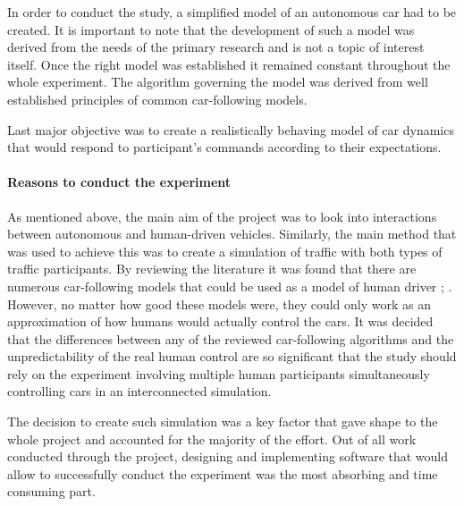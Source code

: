 \documentclass[11pt,english,twoside]{article}
\begin{document}
\par

In order to conduct the study, a simplified model of an autonomous car had to be created. It is important to note that the development of such a model was derived from the needs of the primary research and is not a topic of interest itself. Once the right model was established it remained constant throughout the whole experiment. The algorithm governing the model was derived from well established principles of common car-following models.


\par

Last major objective was to create a realistically behaving model of car dynamics that would respond to participant's commands according to their expectations. 



\paragraph{Reasons to conduct the experiment}

As mentioned above, the main aim of the project was to look into interactions between autonomous and human-driven vehicles. Similarly, the main method that was used to achieve this was to create a simulation of traffic with both types of traffic participants. By reviewing the literature it was found that there are numerous car-following models that could be used as a model of human driver \citep{rothery1992car}; \citep{treiber2013traffic}. However, no matter how good these models were, they could only work as an approximation of how humans would actually control the cars. It was decided that the differences between any of the reviewed car-following algorithms and the unpredictability of the real human control are so significant that the study should rely on the experiment involving multiple human participants simultaneously controlling cars in an interconnected simulation.
 \par
The decision to create such simulation was a key factor that gave shape to the whole project and accounted for the majority of the effort. Out of all work conducted through the project, designing and implementing software that would allow to successfully conduct the experiment was the most absorbing and time consuming part.



\end{document}
